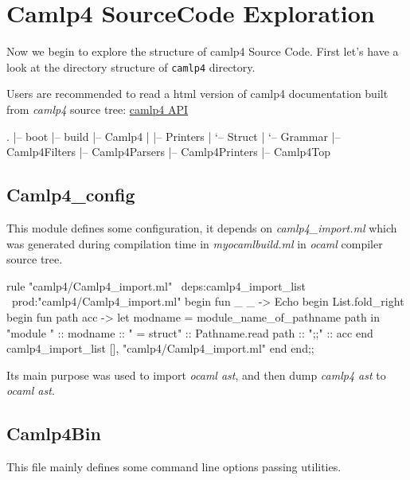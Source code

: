 \section{Camlp4 SourceCode Exploration}
Now we begin to explore the structure of camlp4 Source Code.  First
let's have a look at the directory structure of \verb|camlp4|
directory.

Users are recommended to read a html version of camlp4 documentation
built from \textit{camlp4} source tree:
\href{http://www.seas.upenn.edu/~hongboz/hongbo_zhang_files/camlp4/}{camlp4 API}

\begin{bashcode}
.
|-- boot
|-- build
|-- Camlp4
|   |-- Printers
|   `-- Struct      
|       `-- Grammar
|-- Camlp4Filters
|-- Camlp4Parsers
|-- Camlp4Printers
|-- Camlp4Top
\end{bashcode}



\subsection{Camlp4\_config}
This module defines some configuration, it depends on
\textit{camlp4\_import.ml} which was generated during compilation time
in \textit{myocamlbuild.ml} in \textit{ocaml} compiler source tree.

\begin{ocamlcode}
  rule "camlp4/Camlp4_import.ml"
  ~deps:camlp4_import_list
  ~prod:"camlp4/Camlp4_import.ml"
  begin fun _ _ ->
    Echo begin
      List.fold_right begin fun path acc ->
        let modname = module_name_of_pathname path in
        "module " :: modname :: " = struct\n" :: Pathname.read path :: "\nend;;\n" :: acc
      end camlp4_import_list [],
      "camlp4/Camlp4_import.ml"
    end
  end;;
\end{ocamlcode}

Its main purpose was used to import \textit{ocaml ast}, and then dump
\textit{camlp4 ast} to \textit{ocaml ast}.


\subsection{Camlp4Bin}
\label{Camlp4Bin}

This file mainly defines some command line options passing utilities.

